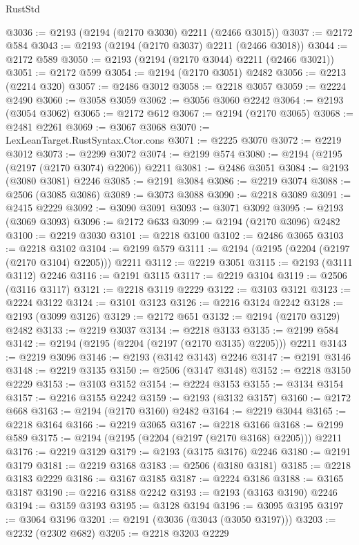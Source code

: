 \begin{lexlean}{RustStd}
\begin{coremodule}
@3036 := @2193 (@2194 (@2170 @3030) @2211 (@2466 @3015))
@3037 := @2172 @584
@3043 := @2193 (@2194 (@2170 @3037) @2211 (@2466 @3018))
@3044 := @2172 @589
@3050 := @2193 (@2194 (@2170 @3044) @2211 (@2466 @3021))
@3051 := @2172 @599
@3054 := @2194 (@2170 @3051) @2482
@3056 := @2213 (@2214 @320)
@3057 := @2486 @3012
@3058 := @2218 @3057
@3059 := @2224 @2490
@3060 := @3058 @3059
@3062 := @3056 @3060 @2242
@3064 := @2193 (@3054 @3062)
@3065 := @2172 @612
@3067 := @2194 (@2170 @3065)
@3068 := @2481 @2261
@3069 := @3067 @3068
@3070 := LexLeanTarget.RustSyntax.Ctor.cons
@3071 := @2225 @3070
@3072 := @2219 @3012
@3073 := @2299 @3072
@3074 := @2199 @574
@3080 := @2194 (@2195 (@2197 (@2170 @3074) @2206)) @2211
@3081 := @2486 @3051
@3084 := @2193 (@3080 @3081) @2246
@3085 := @2191 @3084
@3086 := @2219 @3074
@3088 := @2506 (@3085 @3086)
@3089 := @3073 @3088
@3090 := @2218 @3089
@3091 := @2415 @2229
@3092 := @3090 @3091
@3093 := @3071 @3092
@3095 := @2193 (@3069 @3093)
@3096 := @2172 @633
@3099 := @2194 (@2170 @3096) @2482
@3100 := @2219 @3030
@3101 := @2218 @3100
@3102 := @2486 @3065
@3103 := @2218 @3102
@3104 := @2199 @579
@3111 := @2194 (@2195 (@2204 (@2197 (@2170 @3104) @2205))) @2211
@3112 := @2219 @3051
@3115 := @2193 (@3111 @3112) @2246
@3116 := @2191 @3115
@3117 := @2219 @3104
@3119 := @2506 (@3116 @3117)
@3121 := @2218 @3119 @2229
@3122 := @3103 @3121
@3123 := @2224 @3122
@3124 := @3101 @3123
@3126 := @2216 @3124 @2242
@3128 := @2193 (@3099 @3126)
@3129 := @2172 @651
@3132 := @2194 (@2170 @3129) @2482
@3133 := @2219 @3037
@3134 := @2218 @3133
@3135 := @2199 @584
@3142 := @2194 (@2195 (@2204 (@2197 (@2170 @3135) @2205))) @2211
@3143 := @2219 @3096
@3146 := @2193 (@3142 @3143) @2246
@3147 := @2191 @3146
@3148 := @2219 @3135
@3150 := @2506 (@3147 @3148)
@3152 := @2218 @3150 @2229
@3153 := @3103 @3152
@3154 := @2224 @3153
@3155 := @3134 @3154
@3157 := @2216 @3155 @2242
@3159 := @2193 (@3132 @3157)
@3160 := @2172 @668
@3163 := @2194 (@2170 @3160) @2482
@3164 := @2219 @3044
@3165 := @2218 @3164
@3166 := @2219 @3065
@3167 := @2218 @3166
@3168 := @2199 @589
@3175 := @2194 (@2195 (@2204 (@2197 (@2170 @3168) @2205))) @2211
@3176 := @2219 @3129
@3179 := @2193 (@3175 @3176) @2246
@3180 := @2191 @3179
@3181 := @2219 @3168
@3183 := @2506 (@3180 @3181)
@3185 := @2218 @3183 @2229
@3186 := @3167 @3185
@3187 := @2224 @3186
@3188 := @3165 @3187
@3190 := @2216 @3188 @2242
@3193 := @2193 (@3163 @3190) @2246
@3194 := @3159 @3193
@3195 := @3128 @3194
@3196 := @3095 @3195
@3197 := @3064 @3196
@3201 := @2191 (@3036 (@3043 (@3050 @3197)))
@3203 := @2232 (@2302 @682)
@3205 := @2218 @3203 @2229

\end{coremodule}
\end{lexlean}
